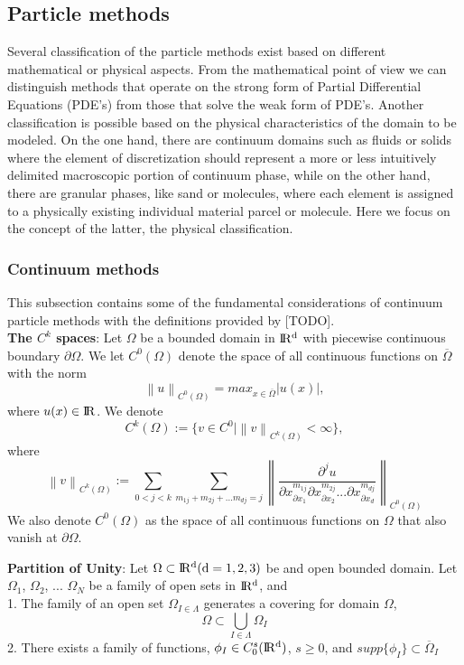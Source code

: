 \documentclass[a4paper,12pt,openany]{book}
\newcommand{\R}{\rm I\!R}
\newcommand{\norm}[1]{\left\lVert#1\right\rVert}
\theoremstyle{break}
\begin{document}
\subsection{Particle methods} \label{sec:particle_method_classification}
Several classification of the particle methods exist based on different mathematical or physical aspects. From the mathematical point of view we can distinguish methods that operate on the strong form of Partial Differential Equations (PDE's) from those that solve the weak form of PDE's. Another classification is possible based on the physical characteristics of the domain to be modeled. On the one hand, there are continuum domains such as fluids or solids where the element of discretization should represent a more or less intuitively delimited macroscopic portion of continuum phase, while on the other hand, there are granular phases, like sand or molecules, where each element is assigned to a physically existing individual material parcel or molecule. Here we focus on the concept of the latter, the physical classification.
\subsubsection{Continuum methods}
This subsection contains some of the fundamental considerations of continuum particle methods with the definitions provided by [TODO]. \\

\textbf{The $C^k$ spaces}: Let $\Omega$ be a bounded domain in $\R^d$ with piecewise continuous boundary $\partial\Omega$. We let $C^0(\Omega)$ denote the space of all continuous functions on $\overline{\Omega}$ with the norm
\begin{equation}
\norm{u}_{C^0(\Omega)}=max_{x\in\overline{\Omega}}|u(x)|,
\end{equation}
where $u(x)\in\R$. We denote
\begin{equation}
C^k(\Omega):=\{v\in C^0\vert\norm{v}_{C^k (\Omega)}<\infty\},
\end{equation}
where
\begin{equation}
\norm{v}_{C^k (\Omega)}:=\sum_{0<j<k}\sum_{m_{1j}+m_{2j}+...m_{dj}=j}\norm{\frac{\partial^j u}{\partial x^{m_{1j}}_{\partial x_1}\partial x^{m_{2j}}_{\partial x_2}...\partial x^{m_{dj}}_{\partial x_d}}}_{C^0(\Omega)}
\end{equation}
We also denote $C^0(\Omega)$ as the space of all continuous functions on $\Omega$ that also vanish at $\partial\Omega$.

\textbf{Partition of Unity}: Let $\Omega \subset \R^d(d=1,2,3)$ be and open bounded domain. Let $\Omega_1$, $\Omega_2$, ... $\Omega_{N}$ be a family of open sets in $\R^d$, and \\
1. The family of an open set ${\Omega}_{I\in\Lambda}$ generates a covering for domain $\Omega$,
\begin{equation}
\Omega\subset\bigcup\limits_{I\in \Lambda} \Omega_I
\end{equation}
2. There exists a family of functions, $\phi_I\in C_0^s(\R^d)$, $s\geq 0$, and $supp\{\phi_I\}\subset \overline{\Omega}_I$
\end{document}

